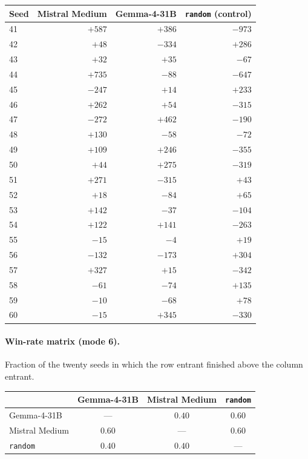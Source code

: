 \documentclass{article}
\begin{document}
\begin{center}
\small
\begin{tabular}{lrrr}
\toprule
Seed & Mistral Medium & Gemma-4-31B & \texttt{random} (control) \\
\midrule
41 & $+587$ & $+386$ & $-973$ \\
42 & $+48$ & $-334$ & $+286$ \\
43 & $+32$ & $+35$ & $-67$ \\
44 & $+735$ & $-88$ & $-647$ \\
45 & $-247$ & $+14$ & $+233$ \\
46 & $+262$ & $+54$ & $-315$ \\
47 & $-272$ & $+462$ & $-190$ \\
48 & $+130$ & $-58$ & $-72$ \\
49 & $+109$ & $+246$ & $-355$ \\
50 & $+44$ & $+275$ & $-319$ \\
51 & $+271$ & $-315$ & $+43$ \\
52 & $+18$ & $-84$ & $+65$ \\
53 & $+142$ & $-37$ & $-104$ \\
54 & $+122$ & $+141$ & $-263$ \\
55 & $-15$ & $-4$ & $+19$ \\
56 & $-132$ & $-173$ & $+304$ \\
57 & $+327$ & $+15$ & $-342$ \\
58 & $-61$ & $-74$ & $+135$ \\
59 & $-10$ & $-68$ & $+78$ \\
60 & $-15$ & $+345$ & $-330$ \\
\bottomrule
\end{tabular}
\end{center}

\paragraph{Win-rate matrix (mode 6).} Fraction of the twenty seeds in which
the row entrant finished above the column entrant.

\begin{center}
\small
\begin{tabular}{lccc}
\toprule
 & Gemma-4-31B & Mistral Medium & \texttt{random} \\
\midrule
Gemma-4-31B    & --- & $0.40$ & $0.60$ \\
Mistral Medium & $0.60$ & --- & $0.60$ \\
\texttt{random} & $0.40$ & $0.40$ & --- \\
\bottomrule
\end{tabular}
\end{center}
\end{document}
